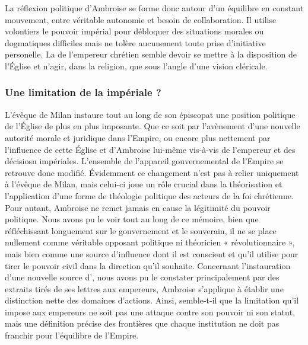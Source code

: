 \bigskip

La réflexion politique d'Ambroise se forme donc autour d'un équilibre en constant mouvement, entre véritable autonomie et besoin de collaboration. Il utilise volontiers le pouvoir impérial pour débloquer des situations morales ou dogmatiques difficiles mais ne tolère aucunement toute prise d'initiative personelle. La  de l'empereur chrétien semble devoir se mettre à la disposition de l'Église et n'agir, dans la religion, que sous l'angle d'une vision cléricale.

\bigskip

\subsubsection{Une limitation de la  impériale ?}

L'évêque de Milan instaure tout au long de son épiscopat une position politique de l'Église de plus en plus imposante. Que ce soit par l'avènement d'une nouvelle autorité morale et juridique dans l'Empire, ou encore plus nettement par l'influence de cette Église et d'Ambroise lui-même vis-à-vis de l'empereur et des décisiosn impériales. L'ensemble de l'appareil gouvernemental de l'Empire se retrouve donc modifié. Évidemment ce changement n'est pas à relier uniquement à l'évêque de Milan, mais celui-ci joue un rôle crucial dans la théorisation et l'application d'une forme de théologie politique des acteurs de la foi chrétienne. Pour autant, Ambroise ne remet jamais en cause la légitimité du pouvoir politique. Nous avons pu le voir tout au long de ce mémoire, bien que réfléchissant longuement sur le gouvernement et le souverain, il ne se place nullement comme véritable opposant politique ni théoricien « révolutionnaire »,  mais bien comme une source d'influence dont il est conscient et qu'il utilise pour tirer le pouvoir civil dans la direction qu'il souhaite. Concernant l'instauration d'une nouvelle source d', nous avons pu le constater principalement par des extraits tirés de ses lettres aux empereurs, Ambroise s'applique à établir une distinction nette des domaines d'actions. Ainsi, semble-t-il que la limitation qu'il impose aux empereurs ne soit pas une attaque contre son pouvoir ni son statut, mais une définition précise des frontières que chaque institution ne doit pas franchir pour l'équilibre de l'Empire.

\bigskip

